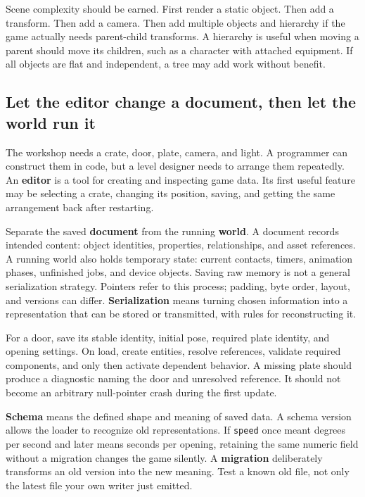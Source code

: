 Scene complexity should be earned. First render a static object. Then add a transform. Then add a camera. Then add multiple objects and hierarchy if the game actually needs parent-child transforms. A hierarchy is useful when moving a parent should move its children, such as a character with attached equipment. If all objects are flat and independent, a tree may add work without benefit.

\subsection{Let the editor change a document, then let the world run it}\label{06-engine-ii-ch032-let-the-editor-change-a-document-then-let-the-world-run-it}

\hypertarget{06-engine-ii-ch032-let-the-editor-change-a-document-then-let-the-world-run-it}{}

The workshop needs a crate, door, plate, camera, and light. A programmer can construct them in code, but a level designer needs to arrange them repeatedly. An \textbf{editor} is a tool for creating and inspecting game data. Its first useful feature may be selecting a crate, changing its position, saving, and getting the same arrangement back after restarting.

Separate the saved \textbf{document} from the running \textbf{world}. A document records intended content: object identities, properties, relationships, and asset references. A running world also holds temporary state: current contacts, timers, animation phases, unfinished jobs, and device objects. Saving raw memory is not a general serialization strategy. Pointers refer to this process; padding, byte order, layout, and versions can differ. \textbf{Serialization} means turning chosen information into a representation that can be stored or transmitted, with rules for reconstructing it.

For a door, save its stable identity, initial pose, required plate identity, and opening settings. On load, create entities, resolve references, validate required components, and only then activate dependent behavior. A missing plate should produce a diagnostic naming the door and unresolved reference. It should not become an arbitrary null-pointer crash during the first update.

\textbf{Schema} means the defined shape and meaning of saved data. A schema version allows the loader to recognize old representations. If \texttt{speed} once meant degrees per second and later means seconds per opening, retaining the same numeric field without a migration changes the game silently. A \textbf{migration} deliberately transforms an old version into the new meaning. Test a known old file, not only the latest file your own writer just emitted.

